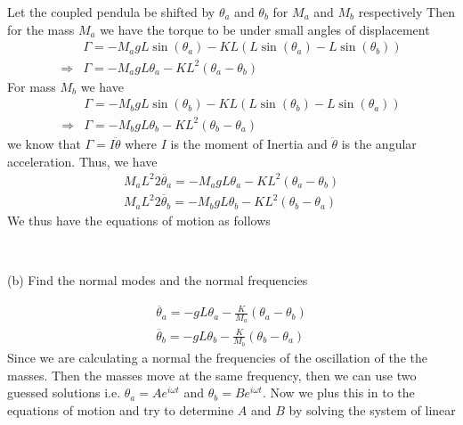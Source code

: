\documentclass[addpoints]{exam}
\begin{document}
\begin{questions}
\begin{solution}
\begin{center}
    \end{center}
    Let the coupled pendula be shifted by $\theta_a$ and $\theta_b$ for $M_a$ and $M_b$ respectively
    Then for the mass $M_a$ we have the torque to be under small angles of displacement 
    \begin{align*}
        &\Gamma = -M_a g L\sin(\theta_a) - KL(L\sin(\theta_a)-L\sin(\theta_b))\\ 
        \Rightarrow&\Gamma = -M_a g L\theta_a - KL^2(\theta_a-\theta_b) 
    \end{align*}
    For mass $M_b$ we have 
    \begin{align*}
        &\Gamma = -M_b g L\sin(\theta_b) - KL(L\sin(\theta_b)-L\sin(\theta_a))\\ 
        \Rightarrow&\Gamma = -M_b g L\theta_b - KL^2(\theta_b-\theta_a) 
    \end{align*}
    we know that $\Gamma = I\ddot{\theta}$ where $I$ is the moment of Inertia and $\ddot{\theta}$ is the angular acceleration. Thus, we have 
    \begin{align*}
        M_a{L^2}{2} \ddot{\theta_a} =   -M_a g L\theta_a - KL^2(\theta_a-\theta_b)\\ 
        M_a{L^2}{2} \ddot{\theta_b} =  -M_b g L\theta_b - KL^2(\theta_b-\theta_a) 
    \end{align*}
    We thus have the equations of motion as follows\\
    \begin{center}
        \\ 
    \end{center}
\end{solution}
\newpage
(b) Find the normal modes and the normal frequencies
\begin{solution}
   \begin{align*}
        \ddot{\theta_a} = -{g}{L}\theta_a - \frac{K}{M_a}(\theta_a-\theta_b)\\
        \ddot{\theta_b} = -{g}{L}\theta_b - \frac{K}{M_b}(\theta_b-\theta_a)
   \end{align*} 
   Since we are calculating a normal the frequencies of the oscillation of the the masses. Then the masses move at the same frequency, then we can use two guessed solutions i.e.
   $\theta_a = Ae^{i\omega t}$ and $\theta_b = B e^{i\omega t}$. Now we plus this in to the equations of motion and try to determine $A$ and $B$ by solving the system of linear 

\end{solution}
\end{questions}
\end{document}
